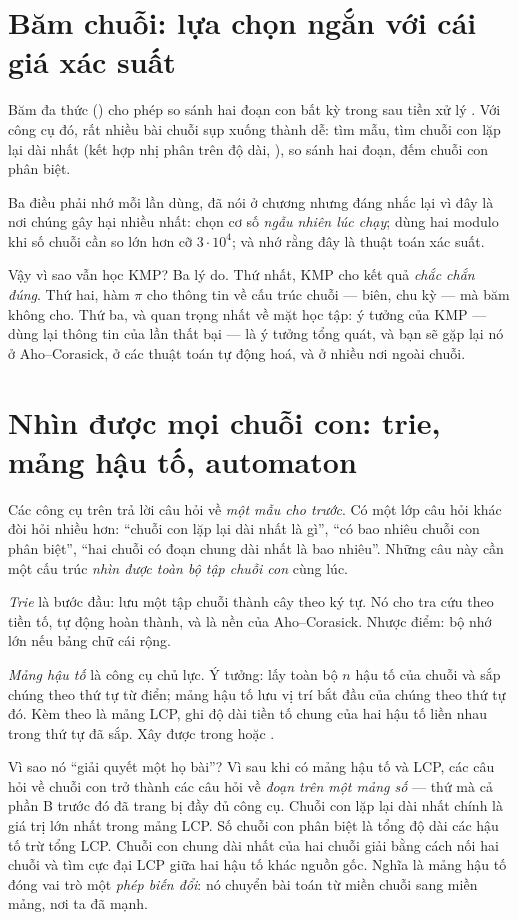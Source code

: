 \documentclass[../../algorithm.tex]{subfiles}
\begin{document}
\section{Băm chuỗi: lựa chọn ngắn với cái giá xác suất}

Băm đa thức () cho phép so sánh hai đoạn con bất kỳ trong  sau tiền xử lý . Với công cụ đó, rất nhiều bài chuỗi sụp xuống thành dễ: tìm mẫu, tìm chuỗi con lặp lại dài nhất (kết hợp nhị phân trên độ dài, ), so sánh hai đoạn, đếm chuỗi con phân biệt.

Ba điều phải nhớ mỗi lần dùng, đã nói ở chương  nhưng đáng nhắc lại vì đây là nơi chúng gây hại nhiều nhất: chọn cơ số \emph{ngẫu nhiên lúc chạy}; dùng hai modulo khi số chuỗi cần so lớn hơn cỡ \(3\cdot 10^4\); và nhớ rằng đây là thuật toán xác suất.

Vậy vì sao vẫn học KMP? Ba lý do. Thứ nhất, KMP cho kết quả \emph{chắc chắn đúng}. Thứ hai, hàm \(\pi\) cho thông tin về cấu trúc chuỗi --- biên, chu kỳ --- mà băm không cho. Thứ ba, và quan trọng nhất về mặt học tập: ý tưởng của KMP --- dùng lại thông tin của lần thất bại --- là ý tưởng tổng quát, và bạn sẽ gặp lại nó ở Aho--Corasick, ở các thuật toán tự động hoá, và ở nhiều nơi ngoài chuỗi.

\section{Nhìn được mọi chuỗi con: trie, mảng hậu tố, automaton}

Các công cụ trên trả lời câu hỏi về \emph{một mẫu cho trước}. Có một lớp câu hỏi khác đòi hỏi nhiều hơn: ``chuỗi con lặp lại dài nhất là gì'', ``có bao nhiêu chuỗi con phân biệt'', ``hai chuỗi có đoạn chung dài nhất là bao nhiêu''. Những câu này cần một cấu trúc \emph{nhìn được toàn bộ tập chuỗi con} cùng lúc.

\emph{Trie} là bước đầu: lưu một tập chuỗi thành cây theo ký tự. Nó cho tra cứu theo tiền tố, tự động hoàn thành, và là nền của Aho--Corasick. Nhược điểm: bộ nhớ lớn nếu bảng chữ cái rộng.

\emph{Mảng hậu tố} là công cụ chủ lực. Ý tưởng: lấy toàn bộ \(n\) hậu tố của chuỗi và sắp chúng theo thứ tự từ điển; mảng hậu tố lưu vị trí bắt đầu của chúng theo thứ tự đó. Kèm theo là mảng LCP, ghi độ dài tiền tố chung của hai hậu tố liền nhau trong thứ tự đã sắp. Xây được trong  hoặc .

Vì sao nó ``giải quyết một họ bài''? Vì sau khi có mảng hậu tố và LCP, các câu hỏi về chuỗi con trở thành các câu hỏi về \emph{đoạn trên một mảng số} --- thứ mà cả phần B trước đó đã trang bị đầy đủ công cụ. Chuỗi con lặp lại dài nhất chính là giá trị lớn nhất trong mảng LCP. Số chuỗi con phân biệt là tổng độ dài các hậu tố trừ tổng LCP. Chuỗi con chung dài nhất của hai chuỗi giải bằng cách nối hai chuỗi và tìm cực đại LCP giữa hai hậu tố khác nguồn gốc. Nghĩa là mảng hậu tố đóng vai trò một \emph{phép biến đổi}: nó chuyển bài toán từ miền chuỗi sang miền mảng, nơi ta đã mạnh.
\end{document}
